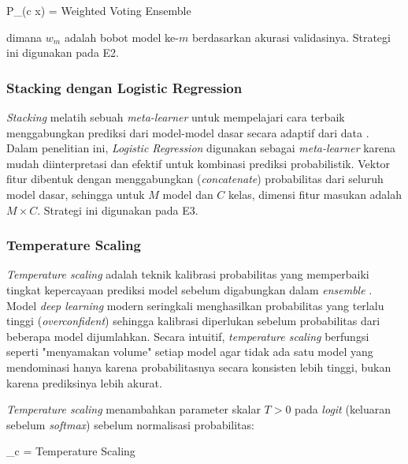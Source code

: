 \begin{equationcaptioned}{
    P_{}(c \mid x) = 
}{
    Weighted Voting Ensemble
}
\end{equationcaptioned}

dimana $w_m$ adalah bobot model ke-$m$ berdasarkan akurasi validasinya.
Strategi ini digunakan pada E2. \par

\subsubsection{Stacking dengan Logistic Regression}
\textit{Stacking} melatih sebuah \textit{meta-learner} untuk mempelajari
cara terbaik menggabungkan prediksi dari model-model dasar secara
adaptif dari data \cite{ganaie2022ensemble}. Dalam penelitian ini,
\textit{Logistic Regression} digunakan sebagai \textit{meta-learner}
karena mudah diinterpretasi dan efektif untuk kombinasi prediksi
probabilistik. Vektor fitur dibentuk dengan menggabungkan
(\textit{concatenate}) probabilitas dari seluruh model dasar, sehingga
untuk $M$ model dan $C$ kelas, dimensi fitur masukan adalah $M \times C$.
Strategi ini digunakan pada E3. \par

\subsubsection{Temperature Scaling}
\textit{Temperature scaling} adalah teknik kalibrasi probabilitas yang
memperbaiki tingkat kepercayaan prediksi model sebelum digabungkan
dalam \textit{ensemble} \cite{guo2017calibration}. Model \textit{deep
learning} modern seringkali menghasilkan probabilitas yang terlalu
tinggi (\textit{overconfident}) sehingga kalibrasi diperlukan sebelum
probabilitas dari beberapa model dijumlahkan. Secara intuitif,
\textit{temperature scaling} berfungsi seperti "menyamakan volume"
setiap model agar tidak ada satu model yang mendominasi hanya karena
probabilitasnya secara konsisten lebih tinggi, bukan karena prediksinya
lebih akurat. \par

\textit{Temperature scaling} menambahkan parameter skalar $T > 0$ pada
\textit{logit} (keluaran sebelum \textit{softmax}) sebelum normalisasi
probabilitas:

\begin{equationcaptioned}{
    _c = 
}{
    Temperature Scaling
}
\end{equationcaptioned}

